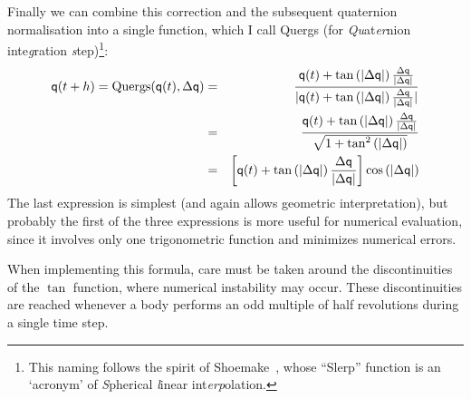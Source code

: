 Finally we can combine this correction and the subsequent quaternion normalisation into
a single function, which I call Quergs (for \emph{Qu}at\emph{er}nion inte\emph{g}ration
\emph{s}tep)\footnote{This naming follows the spirit of Shoemake~\cite{Shoemake:85}, whose
``Slerp'' function is an `acronym' of \emph{S}pherical \emph{l}inear int\emph{erp}olation.}:
\begin{eqnarray*}
\mathsf{q}(t+h) = \mathrm{Quergs}(\mathsf{q}(t), \Delta\mathsf{q}) &=&
    \frac{\mathsf{q}(t) + \tan\left(|\Delta\mathsf{q}|\right)
        \frac{\Delta\mathsf{q}}{|\Delta\mathsf{q}|}}{
    |\mathsf{q}(t) + \tan\left(|\Delta\mathsf{q}|\right)
        \frac{\Delta\mathsf{q}}{|\Delta\mathsf{q}|}|} \\
&=& \frac{\mathsf{q}(t) + \tan\left(|\Delta\mathsf{q}|\right)
        \frac{\Delta\mathsf{q}}{|\Delta\mathsf{q}|}}{
    \sqrt{1 + \tan^2\left(|\Delta\mathsf{q}|\right)}} \\
&=& \left[\mathsf{q}(t) + \tan\left(|\Delta\mathsf{q}|\right)
        \frac{\Delta\mathsf{q}}{|\Delta\mathsf{q}|}\right]
    \cos\left(|\Delta\mathsf{q}|\right)
\end{eqnarray*}
The last expression is simplest (and again allows geometric interpretation), but probably
the first of the three expressions is more useful for numerical evaluation, since it involves
only one trigonometric function and minimizes numerical errors.

When implementing this formula, care must be taken around the discontinuities of the $\tan$
function, where numerical instability may occur. These discontinuities are reached whenever a
body performs an odd multiple of half revolutions during a single time step.
